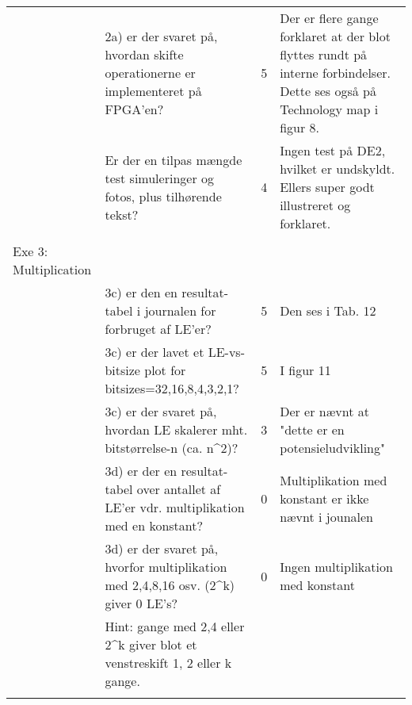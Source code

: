 \begin{table}[h]
\begin{tabularx}{\textwidth}{p{3.5cm}Xp{5mm}X}
                                              & 2a) er der svaret på, hvordan skifte operationerne er implementeret på FPGA’en?                     & 5 & Der er flere gange forklaret at der blot flyttes rundt på interne forbindelser. Dette ses også på Technology map i figur 8.            \\
                                              & Er der en tilpas mængde test simuleringer og fotos, plus tilhørende tekst?                          & 4 & Ingen test på DE2, hvilket er undskyldt. Ellers super godt illustreret og forklaret.    \\
                                              &                                                                                                     &   &                                                           \\\midrule
        Exe 3: Multiplication                 &                                                                                                     &   &                                                           \\
                                              & 3c) er den en resultat-tabel i journalen for forbruget af LE’er?                                    & 5 & Den ses i Tab. 12                            \\
                                              & 3c) er der lavet et LE-vs-bitsize plot for bitsizes=32,16,8,4,3,2,1?                                & 5 & I figur 11                \\
                                              & 3c) er der svaret på, hvordan LE skalerer mht. bitstørrelse-n (ca. n\textasciicircum{}2)?           & 3 & Der er nævnt at "dette er en potensieludvikling"                                \\
                                              & 3d) er der en resultat-tabel over antallet af LE’er vdr. multiplikation med en konstant?            & 0 & Multiplikation med konstant er ikke nævnt i jounalen                      \\
                                              & 3d) er der svaret på, hvorfor multiplikation med 2,4,8,16 osv. (2\textasciicircum{}k) giver 0 LE’s? & 0 &Ingen multiplikation med konstant \\
                                              & Hint: gange med 2,4 eller 2\textasciicircum{}k giver blot et venstreskift 1, 2 eller k gange.       &   &                                                           \\
                                              &                                                                                                     &   &                                                           \\\midrule
    \end{tabularx}
\end{table}
